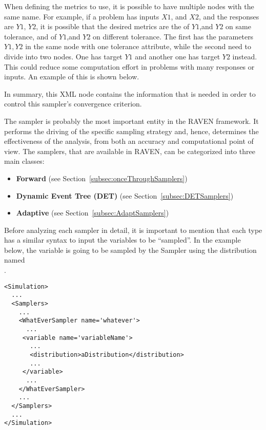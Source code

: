 {\begin{itemize}
      \nb When defining the metrics to use, it is possible to have multiple nodes with the same name.  For
      example, if a problem has inputs $X1$, and $X2$, and the responses are $Y1$, $Y2$, it is possible that
      the desired metrics are the  of $Y1$,and $Y2$ on same tolerance, and 
      of $Y1$,and $Y2$ on different tolerance. The first has the parameters $Y1,Y2$ in the same node with one
      tolerance attribute, while the second need to divide into two nodes. One has target $Y1$ and another one
      has target $Y2$ instead.  This could reduce some computation effort in problems with many responses or inputs.
      An example of this is shown below.\\

    \end{itemize}

    In summary, this XML node contains the information that is needed in order
    to control this sampler's convergence criterion.
}
%



The sampler is probably the most important entity in the RAVEN framework.
%
It performs the driving of the specific sampling strategy and, hence, determines
the effectiveness of the analysis, from both an accuracy and computational point
of view.
%
The samplers, that are available in RAVEN, can be categorized into three main
classes:
\begin{itemize}
\item \textbf{Forward} (see Section~\ref{subsec:onceThroughSamplers})
\item \textbf{Dynamic Event Tree (DET)} (see Section~\ref{subsec:DETSamplers})
\item \textbf{Adaptive} (see Section~\ref{subsec:AdaptSamplers})
\end{itemize}
Before analyzing each sampler in detail, it is important to mention that each
type has a similar syntax to input the variables to be ``sampled''.
%
In the example below, the variable  is going to be
sampled by the Sampler  using the distribution named\\
.
\begin{lstlisting}[style=XML]
<Simulation>
  ...
  <Samplers>
    ...
    <WhatEverSampler name='whatever'>
      ...
     <variable name='variableName'>
       ...
       <distribution>aDistribution</distribution>
       ...
     </variable>
      ...
    </WhatEverSampler>
    ...
  </Samplers>
  ...
</Simulation>
\end{lstlisting}

